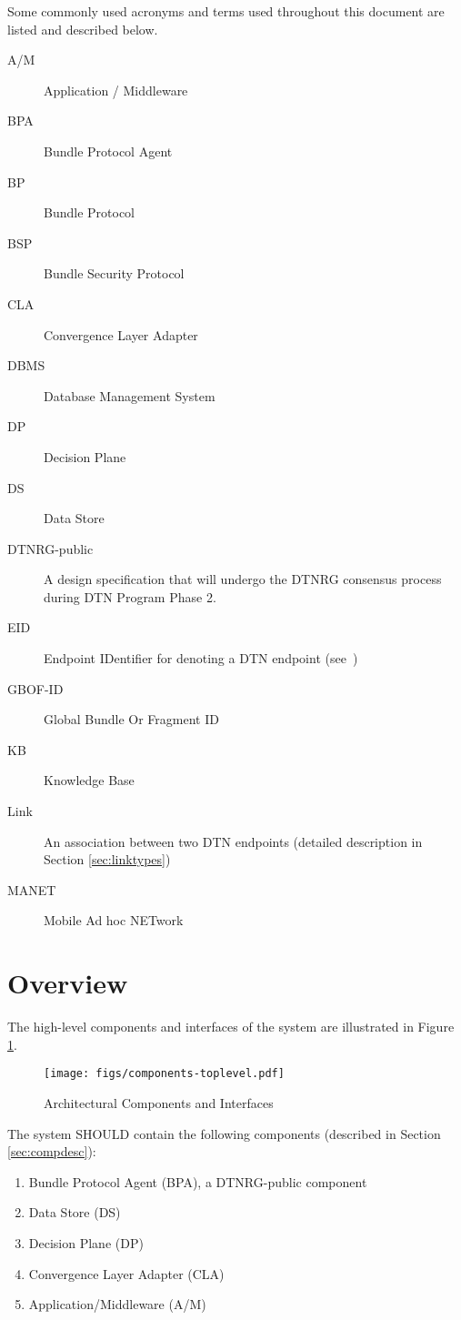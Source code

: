 \documentclass[11pt]{article}
\begin{document}
Some commonly used acronyms and terms used throughout this document are listed
and described below.

\begin{description}
\item[A/M] Application / Middleware
\item[BPA] Bundle Protocol Agent
\item[BP] Bundle Protocol
\item[BSP] Bundle Security Protocol
\item[CLA] Convergence Layer Adapter
\item[DBMS] Database Management System
\item[DP] Decision Plane
\item[DS] Data Store
\item[DTNRG-public] A design specification that will undergo the DTNRG consensus process during DTN Program Phase 2.
\item[EID] Endpoint IDentifier for denoting a DTN endpoint (see~\cite{BP-ID})
\item[GBOF-ID] Global Bundle Or Fragment ID
\item[KB] Knowledge Base
\item[Link] An association between two DTN endpoints (detailed description in Section \ref{sec:linktypes})
\item[MANET] Mobile Ad hoc NETwork
\end{description}

\newpage
\section{Overview} \label{sec:complist}

The high-level components and interfaces of the system are illustrated in 
Figure \ref{fig:componly}.

\begin{figure}[htbp]
\centering
\texttt{[image: figs/components-toplevel.pdf]}
\caption{\label{fig:componly} Architectural Components and Interfaces}
\end{figure}
%

The system SHOULD contain the following components (described in
Section \ref{sec:compdesc}):

\vspace{-4pt}
\begin{enumerate}
\setlength{\parskip}{-3pt}
\item Bundle Protocol Agent (BPA), a DTNRG-public component
\item Data Store (DS)
\item Decision Plane (DP)
\item Convergence Layer Adapter (CLA)
\item Application/Middleware (A/M)
\end{enumerate}
\end{document}
